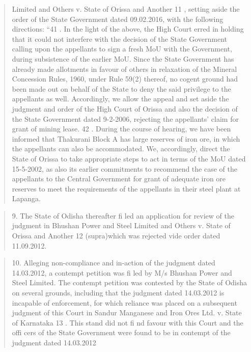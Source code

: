\documentclass[12pt,a4paper]{article}
\newenvironment{judgequote}
  {\begin{quote}\small}
  {\end{quote}}
\begin{document}
\begin{judgequote}
Limited and Others v. State of Orissa and Another 11 , setting aside the order
of the State Government dated 09.02.2016, with the following directions:
``41 . In the light of the above, the High Court erred in holding that it
could not interfere with the decision of the State Government calling
upon the appellants to sign a fresh MoU with the Government, during
subsistence of the earlier MoU. Since the State Government has already
made allotments in favour of others in relaxation of the Mineral
Concession Rules, 1960, under Rule 59(2) thereof, no cogent ground
had been made out on behalf of the State to deny the said privilege
to the appellants as well. Accordingly, we allow the appeal and set
aside the judgment and order of the High Court of Orissa and also
the decision of the State Government dated 9-2-2006, rejecting the
appellants' claim for grant of mining lease.
42 . During the course of hearing, we have been informed that Thakurani
Block A has large reserves of iron ore, in which the appellants can
also be accommodated. We, accordingly, direct the State of Orissa to
take appropriate steps to act in terms of the MoU dated 15-5-2002, as
also its earlier commitments to recommend the case of the appellants
to the Central Government for grant of adequate iron ore reserves to
meet the requirements of the appellants in their steel plant at Lapanga.
\end{judgequote}

\begin{judgequote}
9. The State of Odisha thereafter fi led an application for review of the
judgment in Bhushan Power and Steel Limited and Others v. State of Orissa
and Another 12 (supra)which was rejected vide order dated 11.09.2012.
\end{judgequote}

\begin{judgequote}
10. Alleging non-compliance and in-action of the judgment dated
14.03.2012, a contempt petition was fi led by M/s Bhushan Power and Steel
Limited. The contempt petition was contested by the State of Odisha on
several grounds, including that the judgment dated 14.03.2012 is incapable
of enforcement, for which reliance was placed on a subsequent judgment of
this Court in Sandur Manganese and Iron Ores Ltd. v. State of Karnataka 13 .
This stand did not fi nd favour with this Court and the offi cers of the State
Government were found to be in contempt of the judgment dated 14.03.2012
\end{judgequote}
\end{document}
